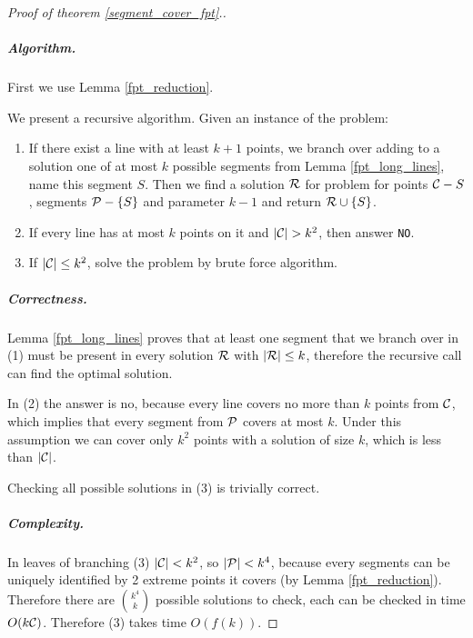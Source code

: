 \begin{proof}[Proof of theorem \ref{segment_cover_fpt}.]\leavevmode



\subparagraph{Algorithm.}
First we use Lemma \ref{fpt_reduction}.

We present a recursive algorithm. Given an instance of the problem:

\begin{enumerate}[label={(\arabic*)}]
\item If there exist a line with at least $k+1$ points, we branch over
adding to a solution one of at most $k$ possible segments
from Lemma \ref{fpt_long_lines}, name this segment $S$.
Then we find a solution $\mathcal{R}$
for problem for points $\mathcal{C} - S$, segments $\mathcal{P} - \{S\}$
and parameter $k-1$ and return $\mathcal{R} \cup \{S\}$.
\item If every line has at most $k$ points on it and $|\mathcal{C}| > k^2$,
then answer \texttt{NO}.
\item If $|\mathcal{C}| \le k^2$, solve the problem by brute force algorithm.
\end{enumerate}

\subparagraph{Correctness.}

Lemma \ref{fpt_long_lines} proves that at least one segment that we
branch over in (1) must be present in every solution $\mathcal{R}$ with $|\mathcal{R}| \le k$,
therefore the recursive call can find the optimal solution.

In (2) the answer is no, because every line covers no more than $k$ points
from $\mathcal{C}$, which implies that every segment from $\mathcal{P}$ covers at most
$k$. Under this assumption
we can cover only $k^2$ points with a solution of size $k$, which is less
than $|\mathcal{C}|$.

Checking all possible solutions in (3) is trivially correct.


\subparagraph{Complexity.}

In leaves of branching (3) $|\mathcal{C}| < k^2$, so $|\mathcal{P}| < k^4$, because
every segments can be uniquely identified by 2 extreme points it covers
(by Lemma \ref{fpt_reduction}). Therefore there are $\binom{k^4}{k}$
possible solutions to check, each can be checked in time $O(k\mathcal{C})$.
Therefore (3) takes time $O(f(k))$.



\end{proof}
